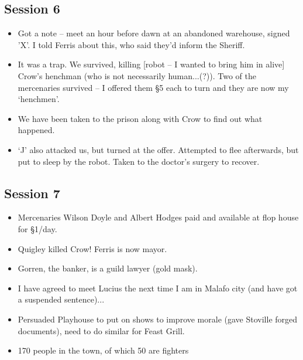\documentclass[10pt,a4paper]{article}
\begin{document}
\subsection*{Session 6}

  \begin{itemize}
    \item Got a note -- meet an hour before dawn at an abandoned warehouse, signed 'X'. I told Ferris about this, who said they'd inform the Sheriff.
    \item It was a trap. We survived, killing [robot -- I wanted to bring him in alive] Crow's henchman (who is not necessarily human...(?)). Two of the mercenaries survived -- I offered them §5 each to turn and they are now my `henchmen'.
    \item We have been taken to the prison along with Crow to find out what happened.
    \item `J' also attacked us, but turned at the offer. Attempted to flee afterwards, but put to sleep by the robot. Taken to the doctor's surgery to recover.
  \end{itemize}
  
\subsection*{Session 7}
  
  \begin{itemize}
    \item Mercenaries Wilson Doyle and Albert Hodges paid and available at flop house for §1/day.
    \item Quigley killed Crow! Ferris is now mayor.
    \item Gorren, the banker, is a guild lawyer (gold mask).
    \item I have agreed to meet Lucius the next time I am in Malafo city (and have got a suspended sentence)...
    \item Persuaded Playhouse to put on shows to improve morale (gave Stoville forged documents), need to do similar for Feast Grill.
    \item 170 people in the town, of which 50 are fighters
  \end{itemize}
\end{document}
